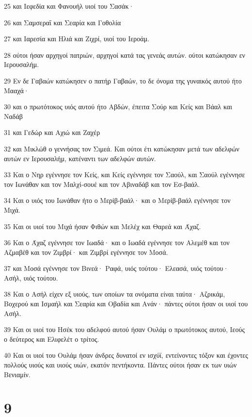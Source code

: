 \par 25 και Ιεφεδία και Φανουήλ υιοί του Σασάκ·
\par 26 και Σαμσεραΐ και Σεαρία και Γοθολία
\par 27 και Ιαρεσία και Ηλιά και Ζιχρί, υιοί του Ιεροάμ.
\par 28 ούτοι ήσαν αρχηγοί πατριών, αρχηγοί κατά τας γενεάς αυτών. ούτοι κατώκησαν εν Ιερουσαλήμ.
\par 29 Εν δε Γαβαών κατώκησεν ο πατήρ Γαβαών, το δε όνομα της γυναικός αυτού ήτο Μααχά·
\par 30 και ο πρωτότοκος υιός αυτού ήτο Αβδών, έπειτα Σούρ και Κείς και Βάαλ και Ναδάβ
\par 31 και Γεδώρ και Αχιώ και Ζαχέρ
\par 32 και Μικλώθ ο γεννήσας τον Σιμεά. Και ούτοι έτι κατώκησαν μετά των αδελφών αυτών εν Ιερουσαλήμ, κατέναντι των αδελφών αυτών.
\par 33 Και ο Νηρ εγέννησε τον Κείς, και Κείς εγέννησε τον Σαούλ, και Σαούλ εγέννησε τον Ιωνάθαν και τον Μαλχί-σουέ και τον Αβιναδάβ και τον Εσ-βαάλ.
\par 34 Και ο υιός του Ιωνάθαν ήτο ο Μερίβ-βαάλ· και ο Μερίβ-βαάλ εγέννησε τον Μιχά.
\par 35 Και οι υιοί του Μιχά ήσαν Φιθών και Μελέχ και Θαρεά και Άχαζ.
\par 36 Και ο Άχαζ εγέννησε τον Ιωαδά· και ο Ιωαδά εγέννησε τον Αλεμέθ και τον Αζμαβέθ και τον Ζιμβρί· και Ζιμβρί εγέννησε τον Μοσά.
\par 37 και Μοσά εγέννησε τον Βινεά· Ραφά, υιός τούτου· Ελεασά, υιός τούτου· Ασήλ, υιός τούτου.
\par 38 Και ο Ασήλ είχεν εξ υιούς, των οποίων τα ονόματα είναι ταύτα· Αζρικάμ, Βοχερού και Ισμαήλ και Σεαρία και Οβαδία και Ανάν· πάντες ούτοι ήσαν οι υιοί του Ασήλ.
\par 39 Και οι υιοί του Ησέκ του αδελφού αυτού ήσαν Ουλάμ ο πρωτότοκος αυτού, Ιεούς ο δεύτερος και Ελιφελέτ ο τρίτος.
\par 40 Και οι υιοί του Ουλάμ ήσαν άνδρες δυνατοί εν ισχύϊ, εντείνοντες τόξον και έχοντες πολλούς υιούς και υιούς υιών, εκατόν πεντήκοντα. Πάντες ούτοι ήσαν εκ των υιών Βενιαμίν.

\chapter{9}

